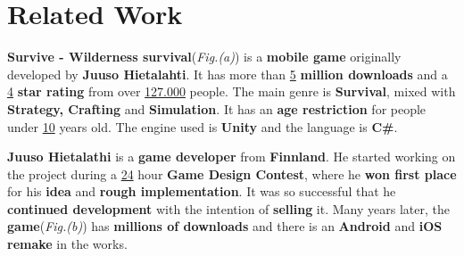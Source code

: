 	\section*{Related Work}
	\par \textbf{Survive - Wilderness survival}\cite{Survive}(\textit{Fig.(a)}) is a \textbf{mobile game} originally developed by \textbf{Juuso Hietalahti}\cite{Juuso}. It has more than \underline{5} \textbf{million downloads} and a \underline{4} \textbf{star rating} from over \underline{127.000} people. The main genre is \textbf{Survival}, mixed with \textbf{Strategy, Crafting} and \textbf{Simulation}. It has an \textbf{age restriction} for people under \underline{10} years old. The engine used is \textbf{Unity} and the language is \textbf{C\#}. 
		\begin{figure}[H]
			\centering
		\end{figure}
		\par \textbf{Juuso Hietalathi}\cite{Juuso} is a \textbf{game developer} from \textbf{Finnland}. He started working on the project during a \underline{24} hour \textbf{Game Design Contest}, where he \textbf{won first place} for his \textbf{idea} and \textbf{rough implementation}. It was so successful that he \textbf{continued development} with the intention of \textbf{selling} it. Many years later, the \textbf{game}(\textit{Fig.(b)}) has \textbf{millions of downloads} and there is an \textbf{Android} and \textbf{iOS remake} in the works.
		\begin{figure}[H]
			\centering
		\end{figure}
\newpage


